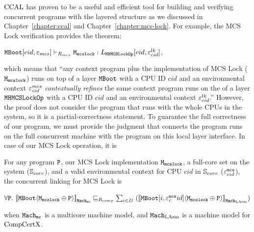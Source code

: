 $\mathrm{CCAL}$
has proven to be a useful and efficient tool 
for building and verifying concurrent programs with the layered structure
as we discussed in Chapter~\ref{chapter:ccal} and Chapter~\ref{chapter:mcs-lock}.
For example, the MCS Lock verification provides
the theorem:
\begin{center}
${\mathrm{\texttt{MBoot}}}[cid, {\varepsilon}_{mcs}] \vdash_{R_{mcs}} {\mathrm{\texttt{M}}}_{{\mathrm{\texttt{mcslock}}}} : L_{{\mathrm{\texttt{MHMCSLockOp}}}}[cid, {\varepsilon}^{lk}_{cid}]$,
\end{center}
which means that ``any context program plus the implementation of MCS Lock (${\mathrm{\texttt{M}}}_{{\mathrm{\texttt{mcslock}}}}$) runs on top of 
 a  layer ${\mathrm{\texttt{MBoot}}}$ with a CPU ID $cid$ and an environmental context ${\varepsilon}^{mcs}_{cid}$ \textit{contextually refines}
 the same context program runs on the of a  layer ${\mathrm{\texttt{MHMCSLockOp}}}$ with a CPU ID $cid$ and an environmental context ${\varepsilon}^{lk}_{cid}$.''
However, the proof does not consider the program that runs with the whole CPUs in the system, so it is a partial-correctness statement. 
To guarantee the full correctness of our program,
we must provide the judgment that connects the program runs on the full concurrent machine with the program on this local layer interface. 
In case of our MCS Lock operation, it is 
\begin{definition}
\label{definition:conlink:con-linking-for-mcs-lock}
For any program $ {\mathrm{\texttt{P}}}$, our MCS Lock implementation ${\mathrm{\texttt{M}}}_{{\mathrm{\texttt{mcslock}}}}$, a full-core set on the system (${\mathbb{S}_{core}}$), and a valid environmental context for CPU  $cid$ in ${\mathbb{S}_{core}}$ (${\varepsilon}^{{\mathrm{\texttt{mcs}}}}_{cid}$), the concurrent linking for MCS Lock is 
\begin{center}
$\forall \codeinmath{P}. \ \semwmachine{\mmcsbootfull}{\codeinmath{M}_{\codeinmath{mcslock}} \oplus \codeinmath{P}}{\hardwarestepkwd} \refines_{R_{comp}} \sum_{i \in D}\  (\semwmachine{\PLayer{\mmcsbootfull}{i}{\oracle^{\codeinmath{mcs}}_cid}}{\codeinmath{M}_{\codeinmath{mcslock}} \oplus \codeinmath{P}}{\lasmmach})$
\end{center}
when  ${{{{\mathrm{\texttt{Mach}}}}_{\mathrm{\texttt{mc}}}}}$ is a multicore machine model, and 
${\mathrm{\texttt{Mach}}}_{\mathrm{LAsm}}$ is a machine model for $\mathrm{CompCertX}$.
\end{definition}

